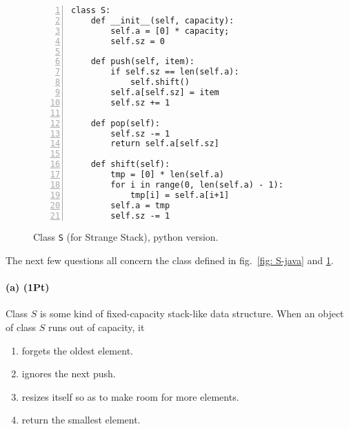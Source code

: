 \documentclass{tufte-handout}
\begin{document}
  \begin{figure}
    \caption{\label{fig: S-python} Class {\tt S} (for Strange Stack), python version.}
    \begin{lstlisting}[basicstyle=\ttfamily,backgroundcolor=\color{white},
      frame=single,rulecolor=\color{gray!20},framesep=10pt,
      linewidth=12cm,numbers= left]
class S:
    def __init__(self, capacity):
        self.a = [0] * capacity;
        self.sz = 0

    def push(self, item):
        if self.sz == len(self.a):
            self.shift()
        self.a[self.sz] = item
        self.sz += 1

    def pop(self):
        self.sz -= 1
        return self.a[self.sz]

    def shift(self):
        tmp = [0] * len(self.a)
        for i in range(0, len(self.a) - 1):
            tmp[i] = self.a[i+1]
        self.a = tmp
        self.sz -= 1
      \end{lstlisting}
    \end{figure}
    
    The next few questions all concern the class defined in fig.~\ref{fig: S-java} and \ref{fig: S-python}.

    \paragraph*{(a) (1Pt)} Class $S$ is some kind of fixed-capacity stack-like data structure.
      When an object of class $S$ runs out of capacity, it
      \begin{enumerate}
      \item forgets the oldest element.\\
      \item ignores the next push.\\
      \item   resizes itself so as to make room for more elements. \\ 
      \item   return the smallest element. \\
 
      \end{enumerate}

      \pagebreak
\end{document}
